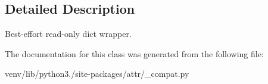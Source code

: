 \subsection{Detailed Description}
\begin{DoxyVerb}Best-effort read-only dict wrapper.
\end{DoxyVerb}
 

The documentation for this class was generated from the following file\+:\begin{DoxyCompactItemize}
\item 
venv/lib/python3./site-\/packages/attr/\+\_\+compat.\+py\end{DoxyCompactItemize}
